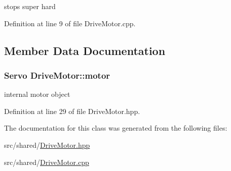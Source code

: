 stops super hard 



Definition at line 9 of file Drive\-Motor.\-cpp.



\subsection{Member Data Documentation}
\hypertarget{classDriveMotor_a27de76439b7bd1035b17faf78be59478}{
\subsubsection[{motor}]{\setlength{\rightskip}{0pt plus 5cm}Servo Drive\-Motor\-::motor\hspace{0.3cm}{\ttfamily [private]}}}\label{classDriveMotor_a27de76439b7bd1035b17faf78be59478}


internal motor object 



Definition at line 29 of file Drive\-Motor.\-hpp.



The documentation for this class was generated from the following files\-:\begin{DoxyCompactItemize}
\item 
src/shared/\hyperlink{DriveMotor_8hpp}{Drive\-Motor.\-hpp}\item 
src/shared/\hyperlink{DriveMotor_8cpp}{Drive\-Motor.\-cpp}\end{DoxyCompactItemize}
